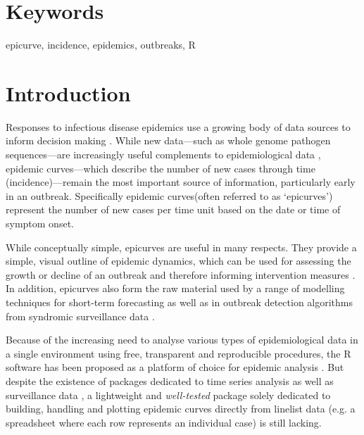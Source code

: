 \documentclass[9pt,a4paper]{extarticle}
\let\cite\citep
\begin{document}
\section*{Keywords}

epicurve, incidence, epidemics, outbreaks, R

\clearpage
\pagestyle{main}
\section*{Introduction}

Responses to infectious disease epidemics use a growing body of data sources to inform decision making \cite{Fraser2009-vg,WHO_Ebola_Response_Team2014-mr,WHO_Ebola_Response_Team2015-ng,Cori2017-cx}. 
While new data---such as whole genome pathogen sequences---are increasingly useful complements to epidemiological data \cite{Gire2014-pn}, epidemic curves---which describe the number of new cases through time (incidence)---remain the most important source of information, particularly early in an outbreak. 
Specifically epidemic curves(often referred to as `epicurves') represent the number of new cases per time unit based on the date or time of symptom onset.

While conceptually simple, epicurves are useful in many respects. They provide a simple, visual outline of epidemic dynamics, which can be used for assessing the growth or decline of an outbreak \cite{nhan2018severe,fitzgerald2014outbreak,barrett2016ongoing,lanini2014measles,jernberg2015outbreak} and therefore informing intervention measures \cite{Meltzer2014-mn,WHO_Ebola_Response_Team2014-mr,WHO_Ebola_Response_Team2015-ng}.
In addition, epicurves also form the raw material used by a range of modelling techniques for short-term forecasting \cite{Cori2013-fc,Funk2016-ci,Nouvellet2017-an,Viboud2017-bb} as well as in outbreak detection algorithms from syndromic surveillance data \cite{Farrington2003-yv,Unkel2012-po}.

Because of the increasing need to analyse various types of epidemiological data in a single environment using free, transparent and reproducible procedures, the R software \cite{R_Core_Team2017-dg} has been proposed as a platform of choice for epidemic analysis \cite{Jombart2014-fw}.
But despite the existence of packages dedicated to time series analysis \cite{Shumway2010-ci} as well as surveillance data \cite{Hohle2007-vp}, a lightweight and \textit{well-tested} package solely dedicated to building, handling and plotting epidemic curves directly from linelist data (e.g. a spreadsheet where each row represents an individual case) is still lacking.
\end{document}
